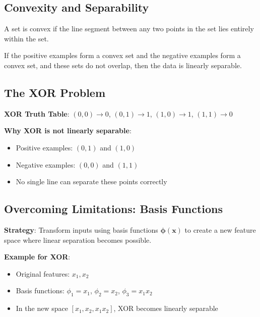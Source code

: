\subsection{Convexity and Separability}

\begin{definition}
A set is convex if the line segment between any two points in the set lies entirely within the set.
\end{definition}

\begin{theorem}
If the positive examples form a convex set and the negative examples form a convex set, and these sets do not overlap, then the data is linearly separable.
\end{theorem}

\subsection{The XOR Problem}

\textbf{XOR Truth Table}: $(0,0) \rightarrow 0$, $(0,1) \rightarrow 1$, $(1,0) \rightarrow 1$, $(1,1) \rightarrow 0$

\textbf{Why XOR is not linearly separable}:
\begin{itemize}
    \item Positive examples: $(0,1)$ and $(1,0)$
    \item Negative examples: $(0,0)$ and $(1,1)$
    \item No single line can separate these points correctly
\end{itemize}

\subsection{Overcoming Limitations: Basis Functions}

\textbf{Strategy}: Transform inputs using basis functions $\bm{\phi}(\bm{x})$ to create a new feature space where linear separation becomes possible.

\textbf{Example for XOR}:
\begin{itemize}
    \item Original features: $x_1, x_2$
    \item Basis functions: $\phi_1 = x_1$, $\phi_2 = x_2$, $\phi_3 = x_1 x_2$
    \item In the new space $[x_1, x_2, x_1 x_2]$, XOR becomes linearly separable
\end{itemize}

